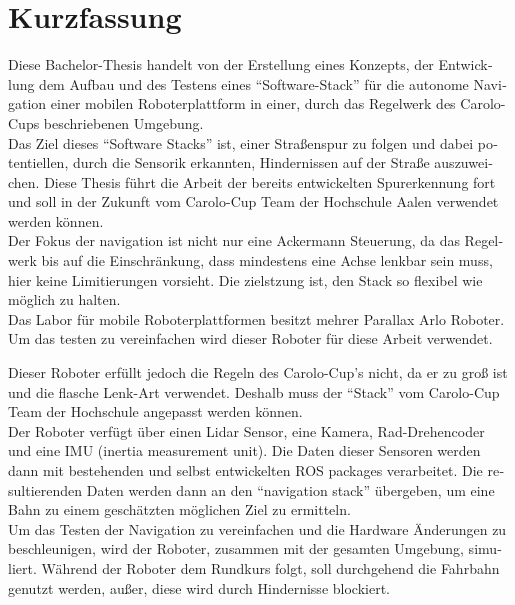 \chapter*{Kurzfassung}
\label{kurzfassung}

\begin{otherlanguage}{ngerman}
Diese Bachelor-Thesis handelt von der Erstellung eines Konzepts, der Entwicklung dem Aufbau und des Testens eines ``Software-Stack'' für die autonome Navigation einer mobilen Roboterplattform in einer, durch das Regelwerk des Carolo-Cups beschriebenen Umgebung.\\

Das Ziel dieses ``Software Stacks'' ist, einer Straßenspur zu folgen und dabei potentiellen, durch die Sensorik erkannten, Hindernissen auf der Straße auszuweichen. Diese Thesis führt die Arbeit der bereits entwickelten Spurerkennung fort und soll in der Zukunft vom Carolo-Cup Team der Hochschule Aalen verwendet werden können.\\

Der Fokus der navigation ist nicht nur eine Ackermann Steuerung, da das Regelwerk bis auf die Einschränkung, dass mindestens eine Achse lenkbar sein muss, hier keine Limitierungen vorsieht\cite{carolocup}. Die zielstzung ist, den Stack so flexibel wie möglich zu halten.\\

Das Labor für mobile Roboterplattformen besitzt mehrer Parallax Arlo Roboter. Um das testen zu vereinfachen wird dieser Roboter für diese Arbeit verwendet.

Dieser Roboter erfüllt jedoch die Regeln des Carolo-Cup's nicht, da er zu groß ist und die flasche Lenk-Art verwendet. Deshalb muss der ``Stack'' vom Carolo-Cup Team der Hochschule angepasst werden können.\\

Der Roboter verfügt über einen Lidar Sensor, eine Kamera, Rad-Drehencoder und eine IMU (inertia measurement unit). Die Daten dieser Sensoren werden dann mit bestehenden und selbst entwickelten ROS packages verarbeitet. Die resultierenden Daten werden dann an den ``navigation stack'' übergeben, um eine Bahn zu einem geschätzten möglichen Ziel zu ermitteln.\\

Um das Testen der Navigation zu vereinfachen und die Hardware Änderungen zu beschleunigen, wird der Roboter, zusammen mit der gesamten Umgebung, simuliert.
Während der Roboter dem Rundkurs folgt, soll durchgehend die Fahrbahn genutzt werden, außer, diese wird durch Hindernisse blockiert.

\end{otherlanguage}
